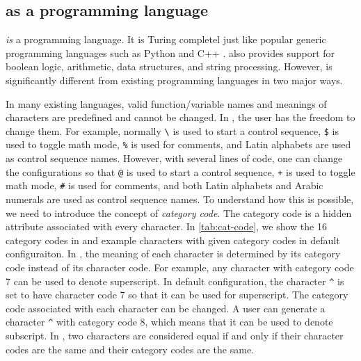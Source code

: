 \documentclass{ltugboat}
\begin{document}
\subsection{\texorpdfstring{\LT{}}{LaTeX} as a programming language}

\LT{} \emph{is} a programming language. 
It is Turing completel just like popular generic programming languages such as Python \cite{vanrossum2010python} and C++ \cite{stroustrup2013cpp}. 
\LT{} also provides support for boolean logic, arithmetic, data structures, and string processing.
However, \LT{} is significantly different from existing programming languages in two major ways.

In many existing languages, valid function/variable names and meanings of characters are predefined and cannot be changed.
In \LT{}, the user has the freedom to change them.
For example, normally \verb|\| is used to start a control sequence, \verb|$| is used to toggle math mode, \verb|%| is used for comments, and Latin alphabets are used as control sequence names.
However, with several lines of code, one can change the configurations so that \verb|@| is used to start a control sequence, \verb|+| is used to toggle math mode, \verb|#| is used for comments, and both Latin alphabets and Arabic numerals are used as control sequence names.
To understand how this is possible, we need to introduce the concept of \emph{category code}.
The category code is a hidden attribute associated with every character.
In \cref{tab:cat-code}, we show the 16 category codes in \LT{} and example characters with given category codes in default \LT{} configuraiton.
In \LT{}, the meaning of each character is determined by its category code instead of its character code. 
For example, any character with category code 7 can be used to denote superscript.
In default \LT{} configuration, the character \verb|^| is set to have character code 7 so that it can be used for superscript.
The category code associated with each character can be changed. 
A user can generate a character \verb|^| with category code 8, which means that it can be used to denote subscript.
In \LT{}, two characters are considered equal if and only if their character codes are the same and their category codes are the same.
\end{document}
